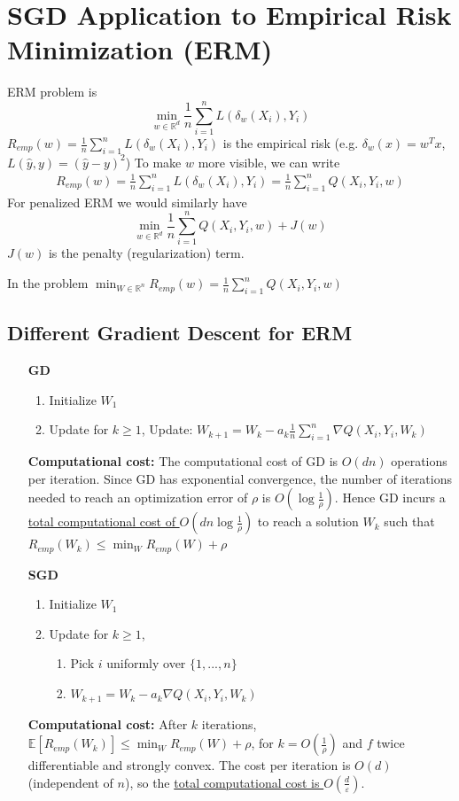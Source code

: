 \documentclass[11pt]{elegantbook}
\begin{document}
\section{SGD Application to Empirical Risk Minimization (ERM)}
ERM problem is
$$\min_{w\in \mathbb{R}^d}\frac{1}{n}\sum_{i=1}^nL(\delta_w(X_i),Y_i)$$
$R_{emp}(w)=\frac{1}{n}\sum_{i=1}^nL(\delta_w(X_i),Y_i)$ is the empirical risk (e.g. $\delta_w(x)=w^Tx$, $L(\hat{y},y)=(\hat{y}-y)^2$)
To make $w$ more visible, we can write
\begin{equation}
    \begin{aligned}
        R_{emp}(w)=\frac{1}{n}\sum_{i=1}^nL(\delta_w(X_i),Y_i)
        =\frac{1}{n}\sum_{i=1}^nQ(X_i,Y_i,w)
    \end{aligned}
    \nonumber
\end{equation}
For penalized ERM we would similarly have $$\min_{w\in \mathbb{R}^d}\frac{1}{n}\sum_{i=1}^nQ(X_i,Y_i,w)+J(w)$$ $J(w)$ is the penalty (regularization) term.

In the problem $\min_{W\in \mathbb{R}^n}R_{emp}(w)=\frac{1}{n}\sum_{i=1}^nQ(X_i,Y_i,w)$

\subsection{Different Gradient Descent for ERM}
\begin{enumerate}
    \item[\textbf{GD}]
    \begin{enumerate}[$\bullet$]
        \item Initialize $W_1$
        \item Update for $k\geq 1$,
        Update: $W_{k+1}=W_k-a_k \frac{1}{n}\sum_{i=1}^n\nabla Q(X_i,Y_i,W_k)$
    \end{enumerate}
    \textbf{Computational cost:} The computational cost of GD is $O(dn)$ operations per iteration. Since GD has exponential convergence, the number of iterations needed to reach an optimization error of $\rho$ is $O(\log\frac{1}{\rho})$. Hence GD incurs a \underline{total computational cost of $O(dn\log\frac{1}{\rho})$} to reach a solution $W_k$ such that $R_{emp}(W_k)\leq \min_WR_{emp}(W)+\rho$
    \item[\textbf{SGD}]
    \begin{enumerate}[$\bullet$]
        \item Initialize $W_1$
        \item Update for $k\geq 1$,
        \begin{enumerate}[{Step} 1:]
            \item Pick $i$ uniformly over $\{1,...,n\}$
            \item $W_{k+1}=W_k-a_k \nabla Q(X_i,Y_i,W_k)$
        \end{enumerate}
    \end{enumerate}
    \textbf{Computational cost:} After $k$ iterations, $\mathbb{E}[R_{emp}(W_k)]\leq \min_W R_{emp}(W)+\rho$, for $k=O(\frac{1}{\rho})$ and $f$ twice differentiable and strongly convex. The cost per iteration is $O(d)$ (independent of $n$), so the \underline{total computational cost is $O(\frac{d}{\varepsilon})$}.
\end{enumerate}
\end{document}
